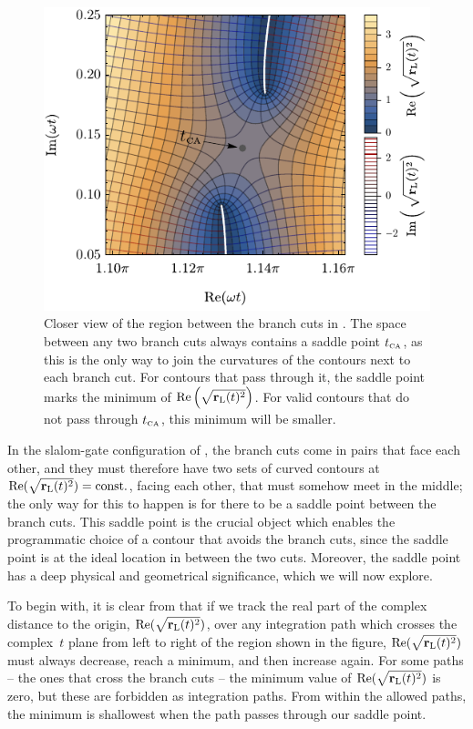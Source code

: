 \begin{figure}[htb]
  \centering
  \includegraphics[scale=1]{5-Quantum-orbits/Figures/figure5F.pdf}
  \caption[
  Closer view of the `slalom gate' between two paired Coulomb branch cuts
  ]{
  Closer view of the region between the branch cuts in . The space between any two branch cuts always contains a saddle point ${t_{\scriptscriptstyle\mathrm{CA}}}$, as this is the only way to join the curvatures of the contours next to each branch cut. For contours that pass through it, the saddle point marks the minimum of $\Re\left(\sqrt{\vb{r}_\mathrm{L}(t)^2}\right)$. For valid contours that do not pass through ${t_{\scriptscriptstyle\mathrm{CA}}}$, this minimum will be smaller.
  }
  \label{f5-tCA-zoom}
\end{figure}

In the slalom-gate configuration of , the branch cuts come in pairs that face each other, and they must therefore have two sets of curved  contours at $\Re(\sqrt{\vb{r}_\mathrm{L}(t)^2})=\mathrm{const.}$, facing each other, that must somehow meet in the middle; the only way for this to happen is for there to be a saddle point between the branch cuts. This saddle point is the crucial object which enables the programmatic choice of a contour that avoids the branch cuts, since the saddle point is at the ideal location in between the two cuts. Moreover, the saddle point has a deep physical and geometrical significance, which we will now explore.

To begin with, it is clear from  that if we track the real part of the complex distance to the origin, $\Re(\sqrt{\vb{r}_\mathrm{L}(t)^2})$, over any integration path which crosses the complex~$t$ plane from left to right of the region shown in the figure, $\Re(\sqrt{\vb{r}_\mathrm{L}(t)^2})$ must always decrease, reach a minimum, and then increase again. For some paths -- the ones that cross the branch cuts -- the minimum value of $\Re(\sqrt{\vb{r}_\mathrm{L}(t)^2})$ is zero, but these are forbidden as integration paths. From within the allowed paths, the minimum is shallowest when the path passes through our saddle point.

